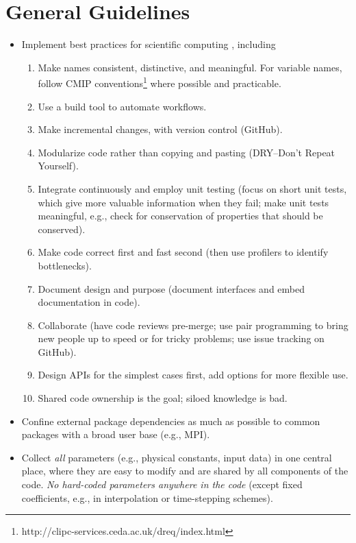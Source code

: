 \documentclass{article}
\begin{document}
\section{General Guidelines}

\begin{itemize}
    \item Implement best practices for scientific computing \citep[e.g.,][]{Wilson14a}, including
        \begin{enumerate}
            \item Make names consistent, distinctive, and meaningful. For variable names, follow CMIP conventions\footnote{http://clipc-services.ceda.ac.uk/dreq/index.html} where possible and practicable.
            \item Use a build tool to automate workflows.
            \item Make incremental changes, with version control (GitHub).
            \item Modularize code rather than copying and pasting (DRY--Don't Repeat Yourself).
            \item Integrate continuously and employ unit testing (focus on short unit tests, which give more valuable information when they fail; make unit tests meaningful, e.g., check for conservation of properties that should be conserved).
            \item Make code correct first and fast second (then use profilers to identify bottlenecks).
            \item Document design and purpose (document interfaces and embed documentation in code).
            \item Collaborate (have code reviews pre-merge; use pair programming to bring new people up to speed or for tricky problems; use issue tracking on GitHub).
            \item Design APIs for the simplest cases first, add options for more flexible use.
            \item Shared code ownership is the goal; siloed knowledge is bad.
        \end{enumerate}
    \item Confine external package dependencies as much as possible to common packages with a broad user base (e.g., MPI).
    \item Collect \emph{all} parameters (e.g., physical constants, input data) in one central place, where they are easy to modify and are shared by all components of the code. \emph{No hard-coded parameters anywhere in the code} (except fixed coefficients, e.g., in interpolation or time-stepping schemes). 

\end{itemize}
\end{document}
